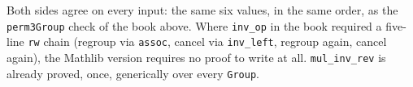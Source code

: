 Both sides agree on every input: the same six values, in the same order, as the \texttt{perm3Group} check of the book above. Where \texttt{inv\_\allowbreak{}op} in the book required a five-line \texttt{rw} chain (regroup via \texttt{assoc}, cancel via \texttt{inv\_\allowbreak{}left}, regroup again, cancel again), the Mathlib version requires no proof to write at all. \texttt{mul\_\allowbreak{}inv\_\allowbreak{}rev} is already proved, once, generically over every \texttt{Group}.
